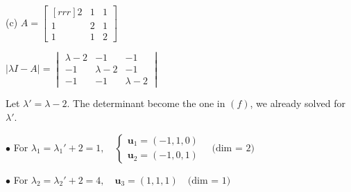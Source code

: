 \documentclass{article}
\begin{document}
    \begin{minipage}[t]{0.48\linewidth}
        (c) $A = \begin{bmatrix}[rrr]
            2 & 1 & 1 \\
            1 & 2 & 1 \\
            1 & 1 & 2 
        \end{bmatrix} $

        $| \lambda I - A| = \begin{vmatrix}
            \lambda  - 2 & -1 & -1 \\
            -1 & \lambda  - 2 & -1 \\
            -1 & -1 & \lambda  - 2
        \end{vmatrix} $

        Let $ \lambda ' = \lambda  - 2$. The determinant become the one in $(f)$, we already solved for $ \lambda '$.
        
        $\bullet$ For $\lambda_1 = \lambda_1' + 2 = 1, \quad \begin{cases}{}
            \textbf{u}_1 = (-1,1,0) \\
            \textbf{u}_2 = (-1,0,1)
        \end{cases} \quad \text{(dim = 2)}$

        $\bullet$ For $\lambda_2 = \lambda_2' + 2 = 4, \quad \textbf{u}_3 = (1,1,1) \quad \text{(dim = 1)}$

    \end{minipage} \hfill
\end{document}
